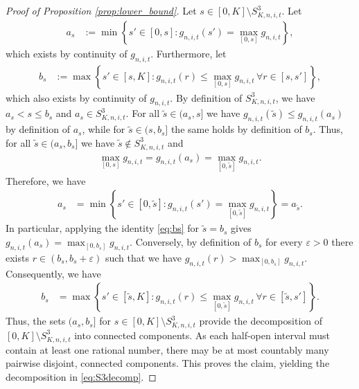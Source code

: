 \documentclass[11pt]{article}
\numberwithin{statement}{section}
\numberwithin{equation}{section}
\theoremstyle{remark}
\newcommand{\eps}{\varepsilon}
\begin{document}
\begin{proof}[Proof of Proposition \ref{prop:lower_bound}]
	Let $s \in [0,K] \setminus S^3_{K,n,i,t} $.
	Let 
	\begin{align}
          a_s & := \min\left\{  s' \in [0,s] : g_{n,i,t}( s') =
                \max_{[0,s]} g_{n,i,t}\right\}, 
	\end{align}
	which exists by continuity of $g_{n,i,t}$.  Furthermore, let
	\begin{align}
          b_s & := \max\left\{  s' \in [s,K] : g_{n,i,t}( r)
                \leq  \max_{[0,s]} g_{n,i,t}\,   \forall r \in
                [s,s'] \right\},
	\end{align}
	which also exists by continuity of $g_{n,i,t}$.  By definition
        of $S^3_{K,n,i,t}$, we have $a_s < s \leq b_s$ and
        $a_s \in S^3_{K,n,i,t}$.  For all $\tilde s \in (a_s,s]$ we
        have $ g_{n,i,t}(\tilde s) \leq g_{n,i,t}(a_s)$ by definition
        of $a_s$, while for $\tilde s \in (s,b_s]$ the same holds by
        definition of $b_s$. Thus, for all
          $\tilde s \in (a_s,b_s]$ we have
          $\tilde s \not \in S^3_{K,n,i,t}$ and
	\begin{align}\label{eq:bs}
		 \max_{[0,s]} g_{n,i,t} = g_{n,i,t}( a_s) =
          \max_{[0,\tilde s]} g_{n,i,t}.
	\end{align}
	Therefore, we have
	\begin{align}
		a_s & = \min\left\{  s' \in [0,\tilde s] : g_{n,i,t}(
                      s') =  \max_{[0,\tilde s]} g_{n,i,t}\right\} =
                      a_{\tilde s}. 
	\end{align}
	In particular, applying the identity \eqref{eq:bs} for $\tilde
        s=b_s$ gives $g_{n,i,t}( a_s) = \max_{[0,b_s]} g_{n,i,t}$.
        Conversely, by definition of $b_s$ for every $\eps>0$ there
        exists $r\in (b_s,b_s+\eps)$ such that we have
        $g_{n,i,t}(r) > \max_{[0,b_s]} g_{n,i,t}$.  Consequently, we
        have
	\begin{align}
          b_s & = \max\left\{  s' \in [\tilde s,K] : g_{n,i,t}( r)
                \leq  \max_{[0,\tilde s]} g_{n,i,t} \, \forall r \in
                [\tilde s ,s'] \right\}.
	\end{align}
	Thus, the sets $(a_s, b_s]$ for
        $s \in [0,K] \setminus S^3_{K,n,i,t}$ provide the
          decomposition of $[0,K] \setminus S^3_{K,n,i,t}$ into
        connected components.  As each half-open interval must contain
        at least one rational number, there may be at most
        countably many pairwise disjoint, connected
        components. This proves the claim, yielding the
          decomposition in \eqref{eq:S3decomp}.
	

\end{proof}
\end{document}
